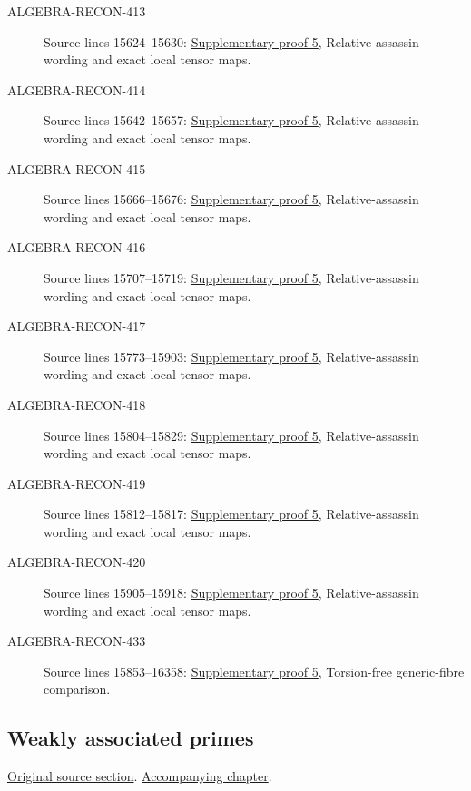 \begin{description}
\item[ALGEBRA-RECON-413] Source lines 15624--15630: \hyperlink{algebra_symbolic_weakass_notes_20260927}{Supplementary proof 5}, Relative-assassin wording and exact local tensor maps.
\item[ALGEBRA-RECON-414] Source lines 15642--15657: \hyperlink{algebra_symbolic_weakass_notes_20260927}{Supplementary proof 5}, Relative-assassin wording and exact local tensor maps.
\item[ALGEBRA-RECON-415] Source lines 15666--15676: \hyperlink{algebra_symbolic_weakass_notes_20260927}{Supplementary proof 5}, Relative-assassin wording and exact local tensor maps.
\item[ALGEBRA-RECON-416] Source lines 15707--15719: \hyperlink{algebra_symbolic_weakass_notes_20260927}{Supplementary proof 5}, Relative-assassin wording and exact local tensor maps.
\item[ALGEBRA-RECON-417] Source lines 15773--15903: \hyperlink{algebra_symbolic_weakass_notes_20260927}{Supplementary proof 5}, Relative-assassin wording and exact local tensor maps.
\item[ALGEBRA-RECON-418] Source lines 15804--15829: \hyperlink{algebra_symbolic_weakass_notes_20260927}{Supplementary proof 5}, Relative-assassin wording and exact local tensor maps.
\item[ALGEBRA-RECON-419] Source lines 15812--15817: \hyperlink{algebra_symbolic_weakass_notes_20260927}{Supplementary proof 5}, Relative-assassin wording and exact local tensor maps.
\item[ALGEBRA-RECON-420] Source lines 15905--15918: \hyperlink{algebra_symbolic_weakass_notes_20260927}{Supplementary proof 5}, Relative-assassin wording and exact local tensor maps.
\item[ALGEBRA-RECON-433] Source lines 15853--16358: \hyperlink{algebra_symbolic_weakass_notes_20260927}{Supplementary proof 5}, Torsion-free generic-fibre comparison.
\end{description}

\subsection{Weakly associated primes}
\hypertarget{algebra-source-section-weakly-ass}{}
\noindent\href{https://github.com/stacks/stacks-project/blob/a04446e57ec1fbc252a871afcec7752fb2807b14/algebra.tex\#L15925}{Original source section}. \href{algebra.pdf\#nameddest=section-weakly-ass}{Accompanying chapter}.

